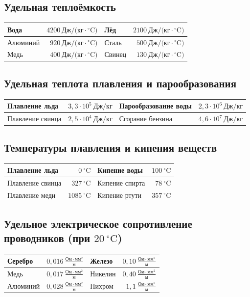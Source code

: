 \subsection*{Удельная теплоёмкость}
\noindent\begin{tabularx}{\linewidth}{X r || X r}
\hline
Вода & $4200~\text{Дж/(кг}\cdot{^\circ}\text{C)}$ & Лёд & $2100~\text{Дж/(кг}\cdot{^\circ}\text{C)}$ \\ \hline
Алюминий & $920~\text{Дж/(кг}\cdot{^\circ}\text{C)}$  & Сталь & $500~\text{Дж/(кг}\cdot{^\circ}\text{C)}$ \\ \hline
Медь & $400~\text{Дж/(кг}\cdot{^\circ}\text{C)}$  & Свинец & $130~\text{Дж/(кг}\cdot{^\circ}\text{C)}$ \\ \hline
\end{tabularx}

\subsection*{Удельная теплота плавления и парообразования}
\noindent\begin{tabularx}{\linewidth}{X r || X r}
\hline
Плавление льда & $3{,}3 \cdot 10^5~\text{Дж/кг}$ & Парообразование воды & $2{,}3 \cdot 10^6~\text{Дж/кг}$ \\ \hline
Плавление свинца & $2{,}5 \cdot 10^4~\text{Дж/кг}$ & Сгорание бензина & $4{,}6 \cdot 10^7~\text{Дж/кг}$ \\ \hline
\end{tabularx}

\subsection*{Температуры плавления и кипения веществ}
\noindent\begin{tabularx}{\linewidth}{X r || X r}
\hline
Плавление льда & $0~^\circ\text{C}$ & Кипение воды & $100~^\circ\text{C}$ \\ \hline
Плавление свинца & $327~^\circ\text{C}$ & Кипение спирта & $78~^\circ\text{C}$ \\ \hline
Плавление меди & $1085~^\circ\text{C}$ & Кипение ртути & $357~^\circ\text{C}$ \\ \hline
\end{tabularx}

\subsection*{Удельное электрическое сопротивление проводников (при $20~^\circ\text{C}$)}
\noindent\begin{tabularx}{\linewidth}{X r || X r}
\hline
Серебро & $0{,}016~\frac{\text{Ом}\cdot\text{мм}^2}{\text{м}}$ & Железо & $0{,}10~\frac{\text{Ом}\cdot\text{мм}^2}{\text{м}}$ \\ \hline
Медь    & $0{,}017~\frac{\text{Ом}\cdot\text{мм}^2}{\text{м}}$ & Никелин & $0{,}40~\frac{\text{Ом}\cdot\text{мм}^2}{\text{м}}$ \\ \hline
Алюминий & $0{,}028~\frac{\text{Ом}\cdot\text{мм}^2}{\text{м}}$ & Нихром & $1{,}1~\frac{\text{Ом}\cdot\text{мм}^2}{\text{м}}$ \\ \hline
\end{tabularx}
\vspace{6pt}
\endgroup
\newpage
